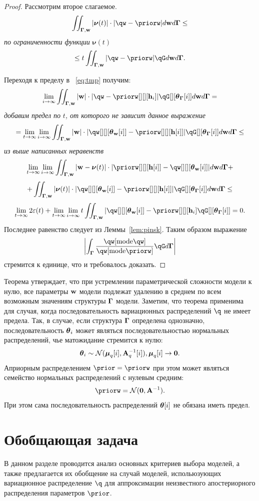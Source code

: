 \begin{proof}
Рассмотрим второе слагаемое.
$$
\iint_{\G,\w} |\boldsymbol{\nu}(t)|\cdot |\qw - \priorw| d\w d\G \leq 
$$
\textit{по ограниченности функции }$\boldsymbol{\nu}(t)$
$$
  \leq  t \iint_{\G,\w}  |\qw - \priorw|\qG d\w d\G.
$$

Переходя к пределу в ~\eqref{eq:tmp} получим:
$$
    \lim_{i \to \infty} \iint_{\G,\w} |\w| \cdot |\qw - \priorw[][][\h_i]|\qG[][{\tetaG[i]}] d\w d\G  =
$$
\textit{добавим предел по }$t$\textit{, от которого не зависит данное выражение}
$$
= \lim_{t \to \infty}\lim_{i \to \infty}\iint_{\G,\w} |\w|\cdot |\qw[][][{\tetaw[i]}] - \priorw[][][{\h[i]}]|\qG[][{\tetaG[i]}] d\w d\G \leq
$$
\textit{из выше написанных неравенств}
$$
    \lim_{t \to \infty}\lim_{i \to \infty} \iint_{\G,\w} |\w -\boldsymbol{\nu}(t)|\cdot|\priorw[][][{\h[i]}] -\qw[][][{\tetaw[i]}]| d\w d\G   +
$$
$$
 + \iint_{\G,\w} |\boldsymbol{\nu}(t)| \cdot |\qw[][][{\tetaw[i]}] - \priorw[][][{\h[i]}]|\qG[][{\tetaG[i]}] d\w d\G \leq
$$
$$
     \lim_{t \to \infty}  2\varepsilon(t)  + \lim_{t \to \infty}\lim_{i \to \infty}  t \iint_{\G,\w}  |\qw[][][{\tetaw[i]}] - \priorw[][][\h_i]\qG[][{\tetaG[i]}] = 0.
$$
Последнее равенство следует из Леммы~\ref{lem:pinsk}.
Таким образом выражение $$\left|\int_{\G} \frac{\qw[\text{mode}\qw]}{\qw[\text{mode}\priorw]}\qG d\G \right|$$ стремится к единице, что и требовалось доказать.
\end{proof}

Теорема утверждает, что при устремлении параметрической сложности модели к нулю, все параметры $\mathbf{w}$  модели подлежат удалению в среднем по всем возможным значениям  структуры $\boldsymbol{\Gamma}$ модели. Заметим, что теорема применима для случая, когда последовательность вариационных распределений $\q$ не имеет предела. Так, в случае, если структура $\boldsymbol{\Gamma}$ определена однозначно, последовательность $\boldsymbol{\theta}_i$ может являться последовательностью нормальных распределений, чье матожидание стремится к нулю:
\[
    \boldsymbol{\theta}_i \sim \mathcal{N}(\boldsymbol{\mu}_q[i], \mathbf{A}^{-1}_q[i]), \boldsymbol{\mu}_q[i] \to \mathbf{0}.
\]
Априорным распределением $\prior = \priorw$ при этом может являться семейство нормальных распределений с нулевым средним:
\[
    \priorw = \mathcal{N}(\mathbf{0}, \A^{-1}).
\]
При этом сама последовательность распределений $\boldsymbol{\theta}[i]$ не обязана иметь предел.

\section{Обобщающая задача}
В данном разделе проводится анализ основных критериев выбора моделей, а также предлагается их обобщение на случай моделей, испольюзующих вариационное распределение $\q$ для аппроксимации неизвестного апостериорного распределения параметров $\prior$.

